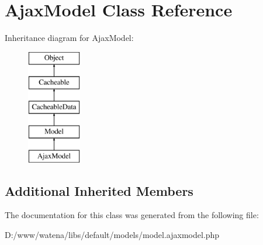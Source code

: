 \hypertarget{class_ajax_model}{\section{Ajax\-Model Class Reference}
\label{class_ajax_model}
}
Inheritance diagram for Ajax\-Model\-:\begin{figure}[H]
\begin{center}
\leavevmode
\includegraphics[height=5.000000cm]{class_ajax_model}
\end{center}
\end{figure}
\subsection*{Additional Inherited Members}


The documentation for this class was generated from the following file\-:\begin{DoxyCompactItemize}
\item 
D\-:/www/watena/libs/default/models/model.\-ajaxmodel.\-php\end{DoxyCompactItemize}
